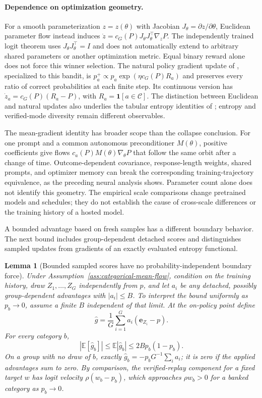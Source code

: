 \documentclass{article}
\newcommand{\enforcehalffinalproseline}{%
  \setlength{\parfillskip}{0pt plus .20\linewidth}}
\newcommand{\1}{\mathbf 1}
\newcommand{\E}{\mathbb E}
\newtheorem{lemma}{Lemma}[section]
\theoremstyle{remark}
\theoremstyle{definition}
\theoremstyle{plain}
\begin{document}
\paragraph{Dependence on optimization geometry.}
For a smooth parameterization $z=z(\theta)$ with Jacobian
$J_\theta=\partial z/\partial\theta$, Euclidean parameter flow instead
induces $\dot z=c_G(P)J_\theta J_\theta^\top\nabla_zP$. The independently
trained logit theorem uses $J_\theta J_\theta^\top=I$ and does not automatically
extend to arbitrary shared parameters or another optimization metric. Equal
binary reward alone does not force this winner selection. The natural policy
gradient update of \citet[Lemma~15]{agarwal2021policygradient}, specialized to
this bandit, is $p_a^+\propto p_a\exp(\eta c_G(P)R_a)$ and preserves
every ratio of correct probabilities at each finite step. Its continuous
version has $\dot z_a=c_G(P)(R_a-P)$, with
$R_a=\1[a\in\mathcal C]$. The distinction between Euclidean and natural
updates also underlies the tabular entropy identities of
\citet[Theorems~1--2]{cui2025entropy}; entropy and verified-mode diversity
remain different observables.

The mean-gradient identity has broader scope than the collapse conclusion.
For one prompt and a common autonomous preconditioner $M(\theta)$, positive
coefficients give flows $c_a(P)M(\theta)\nabla_\theta P$ that follow the same
orbit after a change of time. Outcome-dependent covariance, response-length
weights, shared prompts, and optimizer memory can break the corresponding
training-trajectory equivalence, as the preceding neural analysis shows.
Parameter count alone does not identify this geometry. The empirical scale
comparisons change pretrained models and schedules; they do not establish
the cause of cross-scale differences or the training history of a hosted
model.

A bounded advantage based on fresh samples has a different boundary behavior.
The next bound includes group-dependent detached scores and distinguishes
sampled updates from gradients of an exactly evaluated entropy functional.

\begin{lemma}[Bounded sampled scores have no probability-independent boundary force]
\enforcehalffinalproseline
\label{lem:sampled-score-bound}
Under Assumption~\ref{ass:categorical-mean-flow}, condition on the training history, draw
$Z_1,\ldots,Z_G$ independently from $p$, and let $a_i$ be any detached,
possibly group-dependent advantages with $|a_i|\le B$. To interpret the
bound uniformly as $p_b\to0$, assume a finite $B$ independent of that limit.
At the on-policy point define
\[
 \widehat g=\frac1G\sum_{i=1}^G a_i(\mathbf e_{Z_i}-p).
\]
For every category $b$,
\[
 |\E[\widehat g_b]|\le\E|\widehat g_b|
 \le 2B p_b(1-p_b).
\]
On a group with no draw of $b$, exactly
$\widehat g_b=-p_bG^{-1}\sum_i a_i$; it is zero if the applied advantages
sum to zero. By comparison, the verified-replay component for a fixed target
$w$ has logit velocity $\rho(w_b-p_b)$, which approaches $\rho w_b>0$
for a banked category as $p_b\to0$.
\end{lemma}
\end{document}
